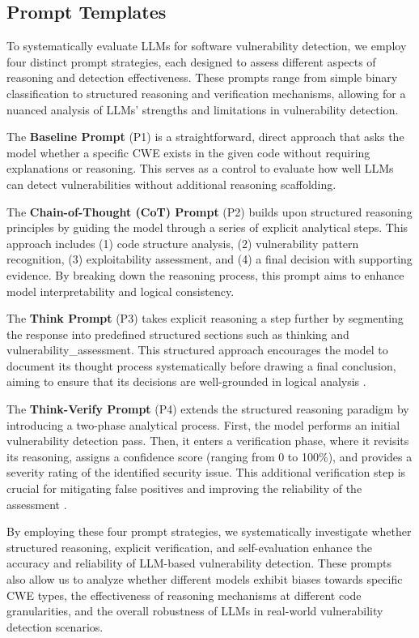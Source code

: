 \documentclass[sigconf,review,anonymous]{acmart}
\begin{document}
\subsection{Prompt Templates}
\label{subsection:prompts}
To systematically evaluate LLMs for software vulnerability detection, we employ four distinct prompt strategies, each designed to assess different aspects of reasoning and detection effectiveness. These prompts range from simple binary classification to structured reasoning and verification mechanisms, allowing for a nuanced analysis of LLMs' strengths and limitations in vulnerability detection.

The \textbf{Baseline Prompt} (P1) is a straightforward, direct approach that asks the model whether a specific CWE exists in the given code without requiring explanations or reasoning. This serves as a control to evaluate how well LLMs can detect vulnerabilities without additional reasoning scaffolding.

The \textbf{Chain-of-Thought (CoT) Prompt} (P2) builds upon structured reasoning principles by guiding the model through a series of explicit analytical steps. This approach includes (1) code structure analysis, (2) vulnerability pattern recognition, (3) exploitability assessment, and (4) a final decision with supporting evidence. By breaking down the reasoning process, this prompt aims to enhance model interpretability and logical consistency.

The \textbf{Think Prompt} (P3) takes explicit reasoning a step further by segmenting the response into predefined structured sections such as \<thinking\> and \<vulnerability\_assessment\>. This structured approach encourages the model to document its thought process systematically before drawing a final conclusion, aiming to ensure that its decisions are well-grounded in logical analysis \cite{xiang2025towards}.

The \textbf{Think-Verify Prompt} (P4) extends the structured reasoning paradigm by introducing a two-phase analytical process. First, the model performs an initial vulnerability detection pass. Then, it enters a verification phase, where it revisits its reasoning, assigns a confidence score (ranging from 0 to 100\%), and provides a severity rating of the identified security issue. This additional verification step is crucial for mitigating false positives and improving the reliability of the assessment \cite{xiang2025towards}.

By employing these four prompt strategies, we systematically investigate whether structured reasoning, explicit verification, and self-evaluation enhance the accuracy and reliability of LLM-based vulnerability detection. These prompts also allow us to analyze whether different models exhibit biases towards specific CWE types, the effectiveness of reasoning mechanisms at different code granularities, and the overall robustness of LLMs in real-world vulnerability detection scenarios.
\end{document}
